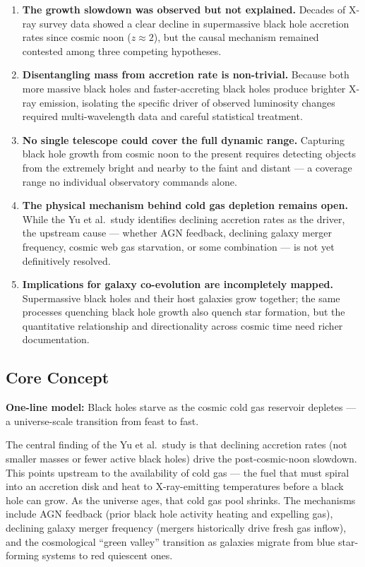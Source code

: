 \documentclass[11pt,letterpaper]{article}
\begin{document}
\begin{enumerate}[label=\textbf{P\arabic*.}]
  \item \textbf{The growth slowdown was observed but not explained.} Decades of X-ray survey data showed a clear decline in supermassive black hole accretion rates since cosmic noon ($z \approx 2$), but the causal mechanism remained contested among three competing hypotheses.

  \item \textbf{Disentangling mass from accretion rate is non-trivial.} Because both more massive black holes and faster-accreting black holes produce brighter X-ray emission, isolating the specific driver of observed luminosity changes required multi-wavelength data and careful statistical treatment.

  \item \textbf{No single telescope could cover the full dynamic range.} Capturing black hole growth from cosmic noon to the present requires detecting objects from the extremely bright and nearby to the faint and distant --- a coverage range no individual observatory commands alone.

  \item \textbf{The physical mechanism behind cold gas depletion remains open.} While the Yu et al.\ study identifies declining accretion rates as the driver, the upstream cause --- whether AGN feedback, declining galaxy merger frequency, cosmic web gas starvation, or some combination --- is not yet definitively resolved.

  \item \textbf{Implications for galaxy co-evolution are incompletely mapped.} Supermassive black holes and their host galaxies grow together; the same processes quenching black hole growth also quench star formation, but the quantitative relationship and directionality across cosmic time need richer documentation.
\end{enumerate}

\subsection{Core Concept}

\textbf{One-line model:} Black holes starve as the cosmic cold gas reservoir depletes --- a universe-scale transition from feast to fast.

The central finding of the Yu et al.\ study is that declining accretion rates (not smaller masses or fewer active black holes) drive the post-cosmic-noon slowdown. This points upstream to the availability of cold gas --- the fuel that must spiral into an accretion disk and heat to X-ray-emitting temperatures before a black hole can grow. As the universe ages, that cold gas pool shrinks. The mechanisms include AGN feedback (prior black hole activity heating and expelling gas), declining galaxy merger frequency (mergers historically drive fresh gas inflow), and the cosmological ``green valley'' transition as galaxies migrate from blue star-forming systems to red quiescent ones.
\end{document}
